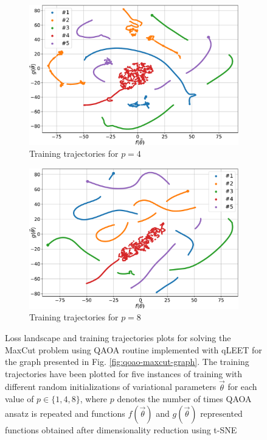 \begin{figure}[htp]
\begin{subfigure}[b]{0.32\linewidth}
        \includegraphics[width=\textwidth]{figures/qleet/training_trajectory_p2.pdf}
        \caption{Training trajectories for $p=4$\label{fig:train-p4}}
    \end{subfigure}
    \begin{subfigure}[b]{0.32\linewidth}
        \includegraphics[width=\textwidth]{figures/qleet/training_trajectory_p3.pdf}
        \caption{Training trajectories for $p=8$\label{fig:train-p8}}
    \end{subfigure}%
    \caption[Loss Landscape and Training Trajectory for QAOA Max-Cut]{Loss landscape and training trajectories plots for solving the MaxCut problem using QAOA routine implemented with qLEET for the graph presented in Fig. \ref{fig:qoao-maxcut-graph}. The training trajectories have been plotted for five instances of training with different random initializations of variational parameters $\vec{\theta}$ for each value of $p\in\{1, 4, 8\}$, where $p$ denotes the number of times QAOA ansatz is repeated and functions $f(\vec{\theta})$ and $g(\vec{\theta})$ represented functions obtained after dimensionality reduction using t-SNE}
    \label{fig:loss-land-train-traj-qleet}
\end{figure}

